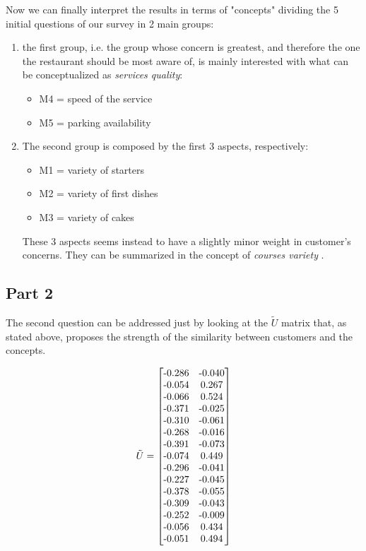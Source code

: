 \documentclass[10pt]{article}
\theoremstyle{plain}
\theoremstyle{definition}
\begin{document}
Now we can finally interpret the results in terms of "concepts" dividing the 5 initial questions of our survey in 2 main groups:

\begin{enumerate}
\item the first group, i.e. the group whose concern is greatest, and therefore the one the restaurant should be most aware of, is mainly interested with what can be conceptualized as \textit{services quality}:
\begin{itemize}
\item M4 = speed of the service

\item M5 = parking availability
\end{itemize}

\item The second group is composed by the first 3 aspects, respectively:
\begin{itemize}
\item M1 = variety of starters 
\item M2 = variety of first dishes 
\item M3 = variety of cakes 
\end{itemize}
These 3 aspects seems instead to have a slightly minor weight in customer's concerns. They can be summarized in the concept of \textit{courses variety }.
\end{enumerate}
\newpage
\subsection{Part 2}
The second question can be addressed just by looking at the $\tilde{U}$ matrix that, as stated above, proposes the strength of the similarity between customers and the concepts.

\begin{equation}
\tilde{U} =\begin{bmatrix}
$-0.286$ & $-0.040$ \\ 
$-0.054$ & $0.267$ \\ 
$-0.066$ & $0.524$ \\ 
$-0.371$ & $-0.025$ \\ 
$-0.310$ & $-0.061$ \\ 
$-0.268$ & $-0.016$ \\ 
$-0.391$ & $-0.073$ \\ 
$-0.074$ & $0.449$ \\ 
$-0.296$ & $-0.041$ \\ 
$-0.227$ & $-0.045$ \\ 
$-0.378$ & $-0.055$ \\ 
$-0.309$ & $-0.043$ \\ 
$-0.252$ & $-0.009$ \\ 
$-0.056$ & $0.434$ \\ 
$-0.051$ & $0.494$ \\ 
\end{bmatrix} 
\end{equation}
\end{document}
